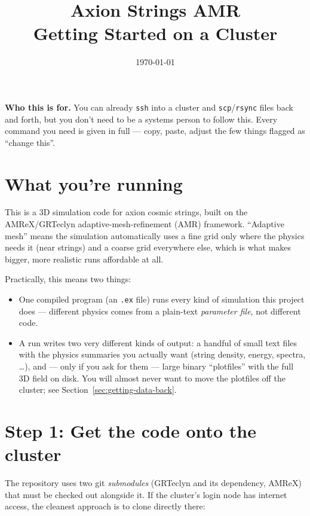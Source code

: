 \documentclass[11pt]{article}
\title{\vspace{-1.5cm}\textbf{\Huge Axion Strings AMR}\\[0.3cm]\Large Getting Started on a Cluster}
\author{}
\date{\today}
\begin{document}
\maketitle
\vspace{-1.2cm}

\begin{note}
\textbf{Who this is for.} You can already \texttt{ssh} into a cluster and \texttt{scp}/\texttt{rsync} files
back and forth, but you don't need to be a systems person to follow this. Every command you need is given
in full --- copy, paste, adjust the few things flagged as ``change this''.
\end{note}

\tableofcontents

\section{What you're running}

This is a 3D simulation code for axion cosmic strings, built on the AMReX/GRTeclyn adaptive-mesh-refinement
(AMR) framework. ``Adaptive mesh'' means the simulation automatically uses a fine grid only where the
physics needs it (near strings) and a coarse grid everywhere else, which is what makes bigger, more
realistic runs affordable at all.

Practically, this means two things:
\begin{itemize}
  \item One compiled program (an \texttt{.ex} file) runs every kind of simulation this project does ---
        different physics comes from a plain-text \emph{parameter file}, not different code.
  \item A run writes two very different kinds of output: a handful of small text files with the physics
        summaries you actually want (string density, energy, spectra, \dots), and --- only if you ask for
        them --- large binary ``plotfiles'' with the full 3D field on disk. You will almost never want to
        move the plotfiles off the cluster; see Section~\ref{sec:getting-data-back}.
\end{itemize}

\section{Step 1: Get the code onto the cluster}

The repository uses two git \emph{submodules} (GRTeclyn and its dependency, AMReX) that must be checked
out alongside it. If the cluster's login node has internet access, the cleanest approach is to clone
directly there:
\end{document}
